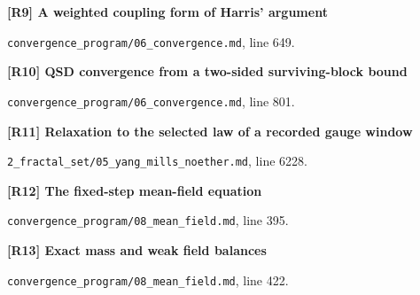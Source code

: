 \documentclass[11pt,a4paper]{article}
\begin{document}
\par\medskip\noindent\begin{minipage}{\linewidth}\textbf{[R9] A weighted coupling form of Harris' argument}\label{src:thm-convergence-conservative-harris}\par
{\small\texttt{}\par
\nolinkurl{convergence_program/06_convergence.md}, line 649.\par}
\end{minipage}\par

\par\medskip\noindent\begin{minipage}{\linewidth}\textbf{[R10] QSD convergence from a two-sided surviving-block bound}\label{src:thm-main-convergence}\par
{\small\texttt{}\par
\nolinkurl{convergence_program/06_convergence.md}, line 801.\par}
\end{minipage}\par

\par\medskip\noindent\begin{minipage}{\linewidth}\textbf{[R11] Relaxation to the selected law of a recorded gauge window}\label{src:thm-ym-qsd-window-relaxation}\par
{\small\texttt{}\par
\nolinkurl{2_fractal_set/05_yang_mills_noether.md}, line 6228.\par}
\end{minipage}\par

\par\medskip\noindent\begin{minipage}{\linewidth}\textbf{[R12] The fixed-step mean-field equation}\label{src:thm-mean-field-equation}\par
{\small\texttt{}\par
\nolinkurl{convergence_program/08_mean_field.md}, line 395.\par}
\end{minipage}\par

\par\medskip\noindent\begin{minipage}{\linewidth}\textbf{[R13] Exact mass and weak field balances}\label{src:thm-mass-conservation}\par
{\small\texttt{}\par
\nolinkurl{convergence_program/08_mean_field.md}, line 422.\par}
\end{minipage}\par
\end{document}
